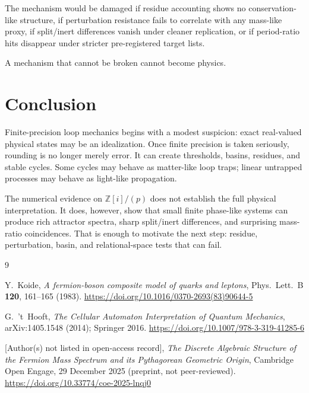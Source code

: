 \documentclass[11pt,a4paper]{article}
\newcommand{\ZGi}{\mathbb{Z}[i]}
\newcommand{\modp}{\ZGi/(p)}
\begin{document}
The mechanism would be damaged if residue accounting shows no conservation-like
structure, if perturbation resistance fails to correlate with any mass-like
proxy, if split/inert differences vanish under cleaner replication, or if
period-ratio hits disappear under stricter pre-registered target lists.

A mechanism that cannot be broken cannot become physics.

\section{Conclusion}

Finite-precision loop mechanics begins with a modest suspicion: exact
real-valued physical states may be an idealization. Once finite precision is
taken seriously, rounding is no longer merely error. It can create thresholds,
basins, residues, and stable cycles. Some cycles may behave as matter-like
loop traps; linear untrapped processes may behave as light-like propagation.

The numerical evidence on $\modp$ does not establish the full physical
interpretation. It does, however, show that small finite phase-like systems can
produce rich attractor spectra, sharp split/inert differences, and surprising
mass-ratio coincidences. That is enough to motivate the next step: residue,
perturbation, basin, and relational-space tests that can fail.

\begin{thebibliography}{9}

Y.~Koide,
\textit{A fermion-boson composite model of quarks and leptons},
Phys.\ Lett.\ B \textbf{120}, 161--165 (1983).
\url{https://doi.org/10.1016/0370-2693(83)90644-5}

G.~'t~Hooft,
\textit{The Cellular Automaton Interpretation of Quantum Mechanics},
arXiv:1405.1548 (2014); Springer 2016.
\url{https://doi.org/10.1007/978-3-319-41285-6}

[Author(s) not listed in open-access record],
\textit{The Discrete Algebraic Structure of the Fermion Mass Spectrum
and its Pythagorean Geometric Origin},
Cambridge Open Engage, 29 December 2025 (preprint, not peer-reviewed).
\url{https://doi.org/10.33774/coe-2025-lnqj0}

\end{thebibliography}
\end{document}

